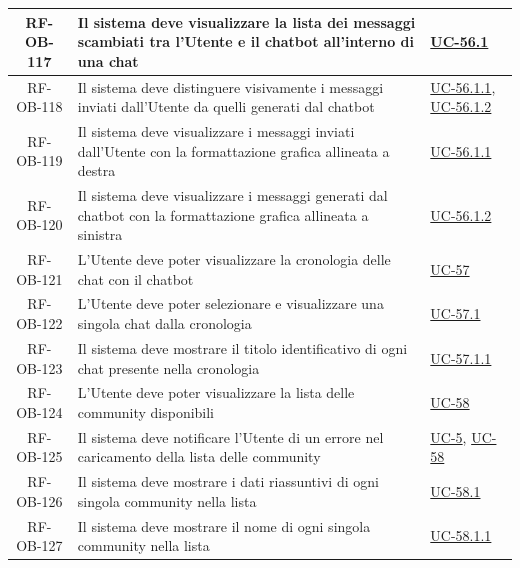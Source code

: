 \documentclass[a4paper,12pt]{article}
\begin{document}
\begin{center}
\begin{longtable}{|c|p{8.5cm}|>{\centering\arraybackslash}p{4cm}|}
RF-OB-117 & Il sistema deve visualizzare la lista dei messaggi scambiati tra l'Utente e il chatbot all'interno di una chat & \hyperref[subsec:UC-56.1]{UC-56.1} \\
\hline

RF-OB-118 & Il sistema deve distinguere visivamente i messaggi inviati dall'Utente da quelli generati dal chatbot & \hyperref[subsec:UC-56.1.1]{UC-56.1.1}, \hyperref[subsec:UC-56.1.2]{UC-56.1.2} \\
\hline

RF-OB-119 & Il sistema deve visualizzare i messaggi inviati dall'Utente con la formattazione grafica allineata a destra & \hyperref[subsec:UC-56.1.1]{UC-56.1.1} \\
\hline

RF-OB-120 & Il sistema deve visualizzare i messaggi generati dal chatbot con la formattazione grafica allineata a sinistra & \hyperref[subsec:UC-56.1.2]{UC-56.1.2} \\
\hline

RF-OB-121 & L'Utente deve poter visualizzare la cronologia delle chat con il chatbot & \hyperref[subsec:UC-57]{UC-57} \\
\hline

RF-OB-122 & L'Utente deve poter selezionare e visualizzare una singola chat dalla cronologia & \hyperref[subsec:UC-57.1]{UC-57.1} \\
\hline

RF-OB-123 & Il sistema deve mostrare il titolo identificativo di ogni chat presente nella cronologia & \hyperref[subsec:UC-57.1.1]{UC-57.1.1} \\
\hline

RF-OB-124 & L'Utente deve poter visualizzare la lista delle community disponibili & \hyperref[sec:UC-58]{UC-58} \\
\hline

RF-OB-125 & Il sistema deve notificare l'Utente di un errore nel caricamento della lista delle community & \hyperref[sec:UC-5]{UC-5}, \hyperref[sec:UC-58]{UC-58} \\
\hline

RF-OB-126 & Il sistema deve mostrare i dati riassuntivi di ogni singola community nella lista & \hyperref[subsec:UC-58.1]{UC-58.1} \\
\hline

RF-OB-127 & Il sistema deve mostrare il nome di ogni singola community nella lista & \hyperref[subsec:UC-58.1.1]{UC-58.1.1} \\
\hline


\end{longtable}
\end{center}
\end{document}
